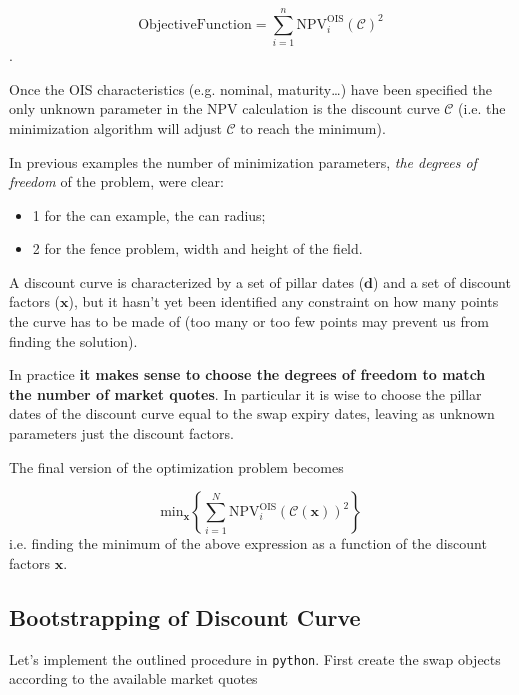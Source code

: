 \begin{equation}
\mathrm{Objective Function} = \sum_{i=1}^{n}\mathrm{NPV}^\mathrm{OIS}_i(\mathcal{C})^2
\end{equation}.

Once the OIS characteristics (e.g. nominal, maturity\ldots) have been specified the only unknown parameter in the NPV calculation is the discount curve $\mathcal{C}$ (i.e. the minimization algorithm will adjust $\mathcal{C}$ to reach the minimum).

In previous examples the number of minimization parameters, \emph{the degrees of freedom} of the problem, were clear:
\begin{itemize}
\item 1 for the can example, the can radius;
\item 2 for the fence problem, width and height of the field.
\end{itemize}

A discount curve is characterized by a set of pillar dates ($\mathbf{d}$) and a set of discount factors ($\mathbf{x}$), but it hasn't yet been identified any constraint on how many points the curve has to be made of (too many or too few points may prevent us from finding the solution).

In practice \textbf{it makes sense to choose the degrees of freedom to match the number of market quotes}. In particular it is wise to choose the pillar dates of the discount curve equal to the swap expiry dates, leaving as unknown parameters just the discount factors.

The final version of the optimization problem becomes

\begin{equation}
 \mathrm{min}_{\mathbf{x}} \left\{\sum_{i=1}^{N}\mathrm{NPV}^\mathrm{OIS}_i( \mathcal{C}(\mathbf{x}))^2\right\}
\end{equation}
i.e. finding the minimum of the above expression as a function of the discount factors $\mathbf{x}$.

\subsection{Bootstrapping of Discount Curve}
Let's implement the outlined procedure in \texttt{python}. First create the swap objects according to the available market quotes

